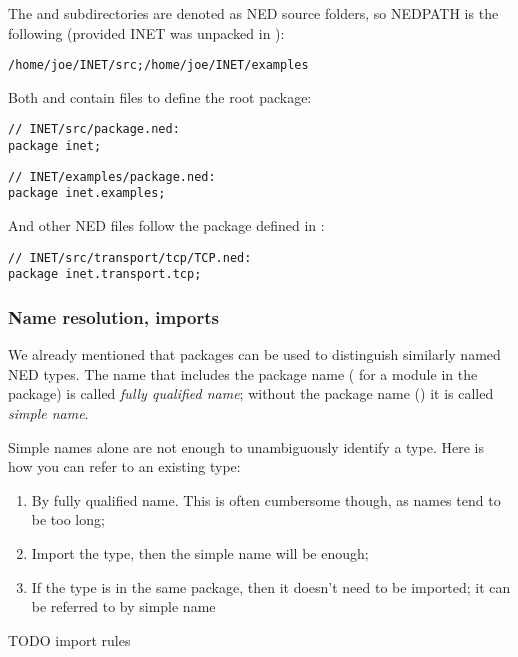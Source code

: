 The  and  subdirectories are denoted as NED source
folders, so NEDPATH is the following (provided INET was unpacked in
):

\begin{Verbatim}
/home/joe/INET/src;/home/joe/INET/examples
\end{Verbatim}

Both  and  contain  files to
define the root package:

\begin{Verbatim}
// INET/src/package.ned:
package inet;
\end{Verbatim}

\begin{Verbatim}
// INET/examples/package.ned:
package inet.examples;
\end{Verbatim}

And other NED files follow the package defined in :

\begin{Verbatim}
// INET/src/transport/tcp/TCP.ned:
package inet.transport.tcp;
\end{Verbatim}


\subsubsection{Name resolution, imports}

We already mentioned that packages can be used to distinguish
similarly named NED types. The name that includes the package name
( for a  module in the 
package) is called \textit{fully qualified name}; without the package
name () it is called \textit{simple name}.

Simple names alone are not enough to unambiguously identify a type.
Here is how you can refer to an existing type:

\begin{enumerate}
  \item By fully qualified name. This is often cumbersome though,
        as names tend to be too long;
  \item Import the type, then the simple name will be enough;
  \item If the type is in the same package, then it doesn't need to be
        imported; it can be referred to by simple name
\end{enumerate}

TODO import rules


